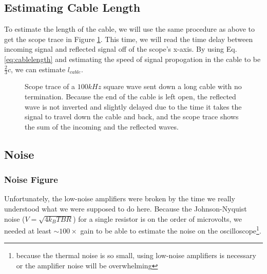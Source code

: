 \documentclass[12pt]{article}
\begin{document}
\subsection*{Estimating Cable Length}
To estimate the length of the cable, we will use the same procedure as above to get the scope trace in Figure \ref{fig:reflections}. This time, we will read the time delay between incoming signal and reflected signal off of the scope's x-axis. By using Eq.\ref{eq:cablelength} and estimating the speed of signal propogation in the cable to be $\frac{2}{3}c$, we can estimate $l_{cable}$.

\begin{figure}[H]
\caption[SODUMB]{Scope trace of a $100kHz$ square wave sent down a long cable with no termination. Because the end of the cable is left open, the reflected wave is not inverted and slightly delayed due to the time it takes the signal to travel down the cable and back, and the scope trace shows the sum of the incoming and the reflected waves.}
\label{fig:reflections}
\end{figure}

\subsection*{Noise}
\subsubsection*{Noise Figure}
Unfortunately, the low-noise amplifiers were broken by the time we really understood what we were supposed to do here. Because the Johnson-Nyquist noise ($V=\sqrt{4k_B T B R}$) for a single resistor is on the order of microvolts, we needed at least $\sim 100\times$ gain to be able to estimate the noise on the oscilloscope\footnote{because the thermal noise is so small, using low-noise amplifiers is necessary or the amplifier noise will be overwhelming}.
\end{document}
